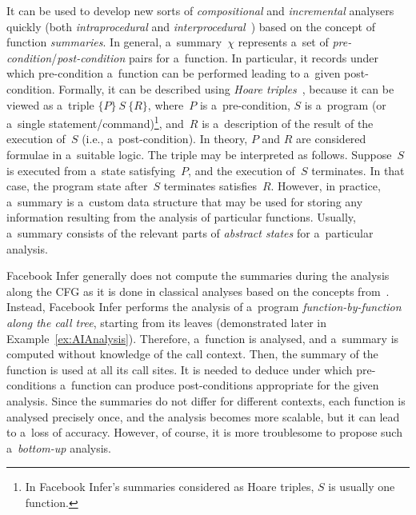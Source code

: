 It can be used to develop new sorts of \emph{compositional} and \emph{incremental} analysers quickly (both \emph{intraprocedural} and \emph{interprocedural}~\cite{programAnalysisNielson}) based on the concept of function \emph{summaries}. In general, a~summary~$ \chi $ represents a~set of \emph{pre-condition}/\emph{post-condition} pairs for a~function. In particular, it records under which pre-condition a~function can be performed leading to a~given post-condition. Formally, it can be described using \emph{Hoare triples}~\cite{hoare}, because it can be viewed as a~triple $ \{P\}\ S\ \{R\} $, where~$ P $ is a~pre-condition, $ S $ is a~program (or a~single statement/command)\footnote{In Facebook Infer's summaries considered as Hoare triples, $ S $ is usually one function.}, and~$ R $ is a~description of the result of the execution of~$ S $ (i.e., a~post-condition). In theory, $ P $ and $ R $ are considered formulae in a~suitable logic. The triple may be interpreted as follows. Suppose~$ S $ is executed from a~state satisfying~$ P $, and the execution of~$ S $ terminates. In that case, the program state after~$ S $ terminates satisfies~$ R $. However, in practice, a~summary is a~custom data structure that may be used for storing any information resulting from the analysis of particular functions. Usually, a~summary consists of the relevant parts of \emph{abstract states} for a~particular analysis.

Facebook Infer generally does not compute the summaries during the analysis along the CFG as it is done in classical analyses based on the concepts from~\cite{DFAGraphReach, DFAApproaches}. Instead, Facebook Infer performs the analysis of a~program \emph{function-by-function along the call tree}, starting from its leaves (demonstrated later in Example~\ref{ex:AIAnalysis}). Therefore, a~function is analysed, and a~summary is computed without knowledge of the call context. Then, the summary of the function is used at all its call sites. It is needed to deduce under which pre-conditions a~function can produce post-conditions appropriate for the given analysis. Since the summaries do not differ for different contexts, each function is analysed precisely once, and the analysis becomes more scalable, but it can lead to a~loss of accuracy. However, of course, it is more troublesome to propose such a~\emph{bottom-up} analysis.

